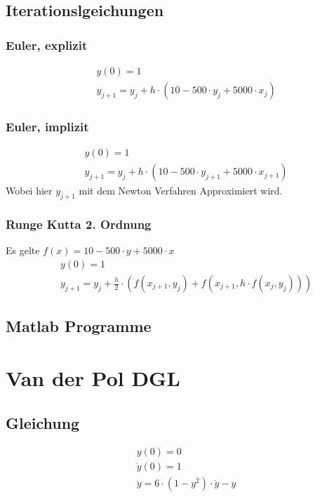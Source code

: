 \documentclass[10pt]{scrartcl}
\begin{document}
	\subsection{Iterationslgeichungen}	
	
	\subsubsection{Euler, explizit}
	\begin{align}
		&y(0)=1\\
		&y_{j+1}=y_{j} + h \cdot (10-500 \cdot y_{j} + 5000 \cdot x_j)
	\end{align}
	
	\subsubsection{Euler, implizit}
	\begin{align}
		&y(0)=1\\
		&y_{j+1}=y_{j} + h \cdot (10-500 \cdot y_{j+1} + 5000 \cdot x_{j+1})
	\end{align}
	Wobei hier $y_{j+1}$ mit dem Newton Verfahren Approximiert wird.
	
	\subsubsection{Runge Kutta 2. Ordnung}
	Es gelte $f(x) = 10-500 \cdot y + 5000 \cdot x$ 
	\begin{align}
		&y(0)=1\\
		&y_{j+1}=y_{j} + \frac{h}{2} \cdot (f(x_{j+1}, y_{j}) + f(x_{j+1}, h \cdot f(x_j, y_j)) )
	\end{align}

\subsection{Matlab Programme}
	
	


\section{Van der Pol DGL}
	\subsection{Gleichung}
		\begin{align}
		&y(0) = 0\\
		&\dot{y}(0) = 1\\
		&\ddot{y} = 6 \cdot (1-y^2) \cdot \dot{y} -y
		\end{align}
\end{document}
